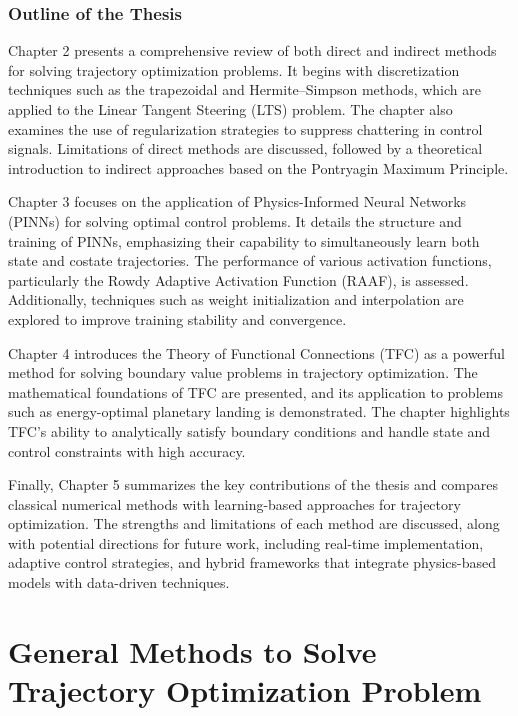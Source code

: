 \documentclass[
  number,
  preprint]{elsarticle}
\begin{document}
\subsubsection*{Outline of the Thesis}\label{outline-of-the-thesis}

Chapter 2 presents a comprehensive review of both direct and indirect
methods for solving trajectory optimization problems. It begins with
discretization techniques such as the trapezoidal and Hermite--Simpson
methods, which are applied to the Linear Tangent Steering (LTS) problem.
The chapter also examines the use of regularization strategies to
suppress chattering in control signals. Limitations of direct methods
are discussed, followed by a theoretical introduction to indirect
approaches based on the Pontryagin Maximum Principle.

Chapter 3 focuses on the application of Physics-Informed Neural Networks
(PINNs) for solving optimal control problems. It details the structure
and training of PINNs, emphasizing their capability to simultaneously
learn both state and costate trajectories. The performance of various
activation functions, particularly the Rowdy Adaptive Activation
Function (RAAF), is assessed. Additionally, techniques such as weight
initialization and interpolation are explored to improve training
stability and convergence.

Chapter 4 introduces the Theory of Functional Connections (TFC) as a
powerful method for solving boundary value problems in trajectory
optimization. The mathematical foundations of TFC are presented, and its
application to problems such as energy-optimal planetary landing is
demonstrated. The chapter highlights TFC's ability to analytically
satisfy boundary conditions and handle state and control constraints
with high accuracy.

Finally, Chapter 5 summarizes the key contributions of the thesis and
compares classical numerical methods with learning-based approaches for
trajectory optimization. The strengths and limitations of each method
are discussed, along with potential directions for future work,
including real-time implementation, adaptive control strategies, and
hybrid frameworks that integrate physics-based models with data-driven
techniques.

\newpage

\section{General Methods to Solve Trajectory Optimization
Problem}\label{general-methods-to-solve-trajectory-optimization-problem}
\end{document}

